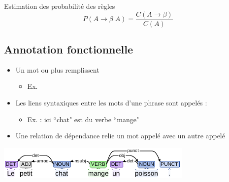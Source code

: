 \documentclass{KodeBook}
\begin{document}
\begin{block}{Estimation des probabilité des règles}
	\[
	P(A \rightarrow \beta | A) = \frac{C(A \rightarrow \beta)}{C(A)}
	\]
\end{block}

\subsection{Annotation fonctionnelle}

\begin{itemize}
	\item Un mot ou plus remplissent 
	\begin{itemize}
		\item Ex. 
	\end{itemize}
	\item Les liens syntaxiques entre les mots d'une phrase sont appelés : 
	\begin{itemize}
		\item Ex.  : ici ``chat" est  du verbe ``mange"
	\end{itemize}
	\item Une relation de dépendance relie un mot appelé  avec un autre appelé 
\end{itemize}

\includegraphics[width=\textwidth]{../img/intro/gram-dep_.pdf}
\end{document}

